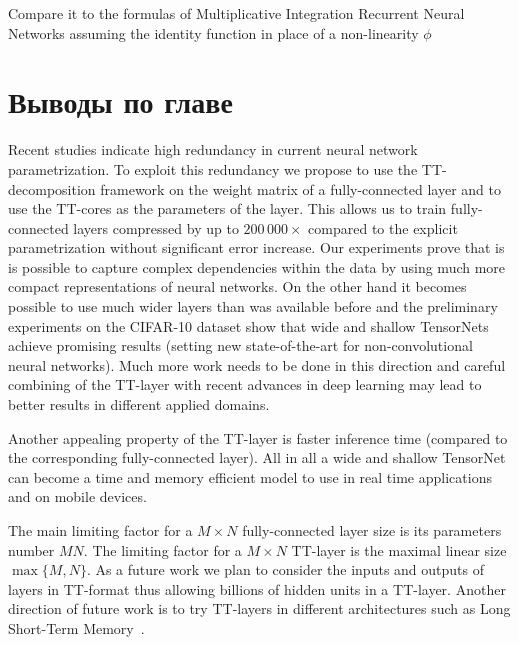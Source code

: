 Compare it to the formulas of Multiplicative Integration Recurrent Neural Networks assuming the identity function in place of a non-linearity $\phi$




\section{Выводы по главе} \label{sec:tensornet-conclusion}
Recent studies indicate high redundancy in current neural network parametrization. To exploit this redundancy we propose to use the TT-decomposition framework on the weight matrix of a fully-connected layer and to use the TT-cores as the parameters of the layer. This allows us to train fully-connected layers compressed by up to $200\,000\times$ compared to the explicit parametrization without significant error increase. Our experiments prove that is is possible to capture complex dependencies within the data by using much more compact representations of neural networks. On the other hand it becomes possible to use much wider layers than was available before and the preliminary experiments on the CIFAR-10 dataset show that wide and shallow TensorNets achieve promising results (setting new state-of-the-art for non-convolutional neural networks). Much more work needs to be done in this direction and careful combining of the TT-layer with recent advances in deep learning may lead to better results in different applied domains.

Another appealing property of the TT-layer is faster inference time (compared to the corresponding fully-connected layer). All in all a wide and shallow TensorNet can become a time and memory efficient model to use in real time applications and on mobile devices.

The main limiting factor for a $M \times N$ fully-connected layer size is its parameters number $MN$. The limiting factor for a $M \times N$ TT-layer is the maximal linear size $\max\{M, N\}$. As a future work we plan to consider the inputs and outputs of layers in TT-format thus allowing billions of hidden units in a TT-layer. Another direction of future work is to try TT-layers in different architectures such as Long Short-Term Memory~\cite{hochreiter1997LSTM}.


